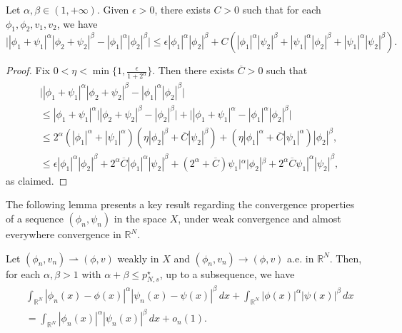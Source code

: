 \documentclass[reqno]{amsart}
\begin{document}
\begin{lemma}\label{l2} 
Let $\alpha,\beta\in (1,+\infty)$. Given $\epsilon>0$, there exists $C>0$ such that 
for each $\phi_1,\phi_2,v_1,v_2$, we have
\[
\Big||\phi_1+\psi_1|^\alpha|\phi_2+\psi_2|^\beta
-|\phi_1|^\alpha|\phi_2|^\beta\Big|
\leq \epsilon |\phi_1|^\alpha|\phi_2|^\beta+C(|\phi_1|^\alpha|\psi_2|^\beta
+|\psi_1|^\alpha|\phi_2|^\beta+|\psi_1|^\alpha|\psi_2|^\beta).
\]
\end{lemma}

\begin{proof}
Fix $0<\eta<\min\lbrace 1,\frac{\epsilon}{1+2^\alpha}  \rbrace$. 
Then there exists $\overline{C}>0$ such that
\begin{align*}
&\Big||\phi_1+\psi_1|^\alpha|\phi_2+\psi_2|^\beta-|\phi_1|^\alpha|\phi_2|^\beta\Big|\\
&\leq|\phi_1+\psi_1|^\alpha \Big||\phi_2+\psi_2|^\beta-|\phi_2|^\beta\Big|
 +\Big||\phi_1+\psi_1|^\alpha-|\phi_1|^\alpha|\phi_2|^\beta\Big|\\
&\leq 2^\alpha(|\phi_1|^\alpha+|\psi_1|^\alpha)(\eta|\phi_2|^\beta
 +\overline{C}|\psi_2|^\beta)
 +(\eta|\phi_1|^\alpha+\overline{C}|\psi_1|^\alpha)|\phi_2|^\beta,\\
&\leq \epsilon |\phi_1|^\alpha|\phi_2|^\beta+2^\alpha\overline{C}|
 \phi_1|^\alpha|\psi_2|^\beta
 +(2^\alpha+\overline{C})\psi_1|^\alpha|\phi_2|^\beta+2^\alpha\overline{C}\psi_1|^\alpha|\psi_2|^\beta,
\end{align*}
as claimed.
\end{proof}

The following lemma presents a key result regarding the convergence properties of a 
sequence $(\phi_n,\psi_n)$ in the space $X$, under weak convergence and almost 
everywhere convergence in $\mathbb{R}^N$.

\begin{lemma}\label{l3} 
Let $(\phi_n,v_n)\rightharpoonup (\phi,v)$ weakly in $X$ and 
$(\phi_n,v_n)\to (\phi,v)$ a.e. in $\mathbb{R}^N$. Then, for each $\alpha,\beta>1$
with $\alpha+\beta\leq p^\star_{N,s}$, up to a subsequence, we have
\begin{align*}
&\int_{\mathbb{R}^N}|\phi_n(x)-\phi(x)|^\alpha|\psi_n(x)-\psi(x)|^\beta\,dx
 +\int_{\mathbb{R}^N} |\phi(x)|^\alpha|\psi(x)|^\beta\,dx \\
&=\int_{\mathbb{R}^N}|\phi_n(x)|^\alpha|\psi_n(x)|^\beta\,dx+o_n(1).
\end{align*}
\end{lemma}
\end{document}

